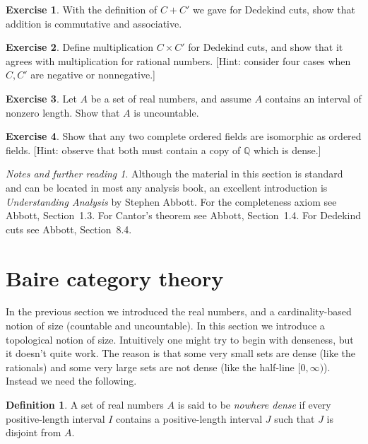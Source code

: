 \documentclass[11pt,oneside,a4paper]{amsbook}
\newcommand{\Q}{\mathbb Q}
\theoremstyle{definition}
\newtheorem{exercise}{Exercise}[section]
\theoremstyle{plain}
\theoremstyle{definition}
\newtheorem{definition}[theorem]{Definition}
\theoremstyle{remark}
\newtheorem*{notes}{Notes and further reading}
\numberwithin{equation}{section}
\numberwithin{figure}{section}
\begin{document}
\begin{exercise}
  With the definition of $C+C'$ we gave for Dedekind cuts, show that addition is commutative and associative.
\end{exercise}

\begin{exercise}
  Define multiplication $C\times C'$ for Dedekind cuts, and show that it agrees with multiplication for rational numbers. [Hint: consider four cases when $C,C'$ are negative or nonnegative.]
\end{exercise}

\begin{exercise}
  Let $A$ be a set of real numbers, and assume $A$ contains an interval of nonzero length. Show that $A$ is uncountable.
\end{exercise}

\begin{exercise}
  Show that any two complete ordered fields are isomorphic as ordered fields. [Hint: observe that both must contain a copy of $\Q$ which is dense.]
\end{exercise}

\begin{notes}
  Although the material in this section is standard and can be located in most any analysis book, an excellent introduction is \emph{Understanding Analysis} by Stephen Abbott. For the completeness axiom see Abbott, Section~1.3. For Cantor's theorem see Abbott, Section~1.4. For Dedekind cuts see Abbott, Section~8.4.
\end{notes}

\newpage
\section{Baire category theory}

In the previous section we introduced the real numbers, and a cardinality-based notion of size (countable and uncountable). In this section we introduce a topological notion of size. Intuitively one might try to begin with denseness, but it doesn't quite work. The reason is that some very small sets are dense (like the rationals) and some very large sets are not dense (like the half-line $[0,\infty)$). Instead we need the following.

\begin{definition}
  A set of real numbers $A$ is said to be \emph{nowhere dense} if every positive-length interval $I$ contains a positive-length interval $J$ such that $J$ is disjoint from $A$.
\end{definition}
\end{document}
